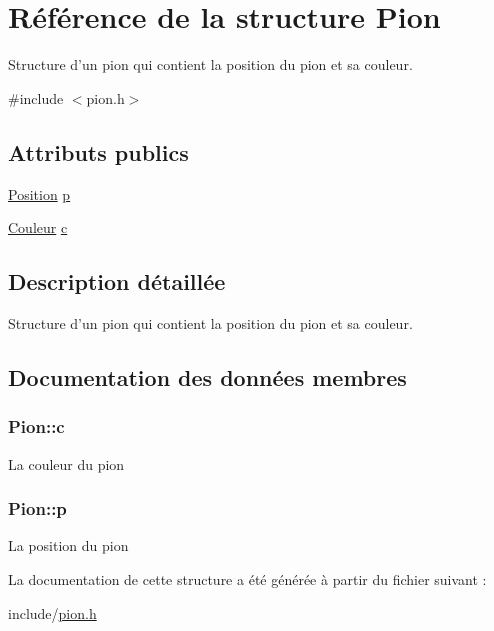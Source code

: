 \hypertarget{structPion}{\section{\-Référence de la structure \-Pion}
\label{structPion}
}


\-Structure d'un pion qui contient la position du pion et sa couleur.  




{\ttfamily \#include $<$pion.\-h$>$}

\subsection*{\-Attributs publics}
\begin{DoxyCompactItemize}
\item 
\hyperlink{structPosition}{\-Position} \hyperlink{structPion_a1a131c2aae6a64827c7fcd6f52fcb47c}{p}
\item 
\hyperlink{couleur_8h_aa304d0ca681f782b1d7735da33037dd7}{\-Couleur} \hyperlink{structPion_a3811851abd3312e2e60a78fbc75081cb}{c}
\end{DoxyCompactItemize}


\subsection{\-Description détaillée}
\-Structure d'un pion qui contient la position du pion et sa couleur. 

\subsection{\-Documentation des données membres}
\hypertarget{structPion_a3811851abd3312e2e60a78fbc75081cb}{
\subsubsection[{c}]{ {\bf \-Pion\-::c}}}\label{structPion_a3811851abd3312e2e60a78fbc75081cb}
\-La couleur du pion \hypertarget{structPion_a1a131c2aae6a64827c7fcd6f52fcb47c}{
\subsubsection[{p}]{ {\bf \-Pion\-::p}}}\label{structPion_a1a131c2aae6a64827c7fcd6f52fcb47c}
\-La position du pion 

\-La documentation de cette structure a été générée à partir du fichier suivant \-:\begin{DoxyCompactItemize}
\item 
include/\hyperlink{pion_8h}{pion.\-h}\end{DoxyCompactItemize}
